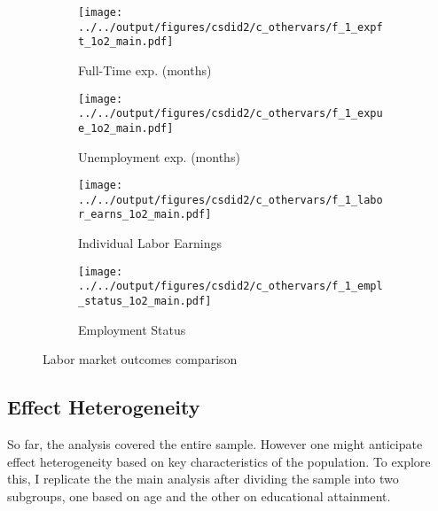 \begin{figure}[tb!]
    \centering
    \begin{subfigure}{0.45\textwidth}
        \caption{Full-Time exp. (months)}
        \texttt{[image: ../../output/figures/csdid2/c\_othervars/f\_1\_expft\_1o2\_main.pdf]}
        \label{sfig:c_expft_main}
    \end{subfigure}
    \begin{subfigure}{0.45\textwidth}
        \caption{Unemployment exp. (months)}
        \texttt{[image: ../../output/figures/csdid2/c\_othervars/f\_1\_expue\_1o2\_main.pdf]}
        \label{sfig:c_expue_main}
    \end{subfigure}
    \begin{subfigure}{0.45\textwidth}
        \caption{Individual Labor Earnings}
        \texttt{[image: ../../output/figures/csdid2/c\_othervars/f\_1\_labor\_earns\_1o2\_main.pdf]}
        \label{sfig:c_labor_earns_main}
    \end{subfigure}
    \begin{subfigure}{0.45\textwidth}
        \caption{Employment Status}
        \texttt{[image: ../../output/figures/csdid2/c\_othervars/f\_1\_empl\_status\_1o2\_main.pdf]}
        \label{sfig:c_empl_status_main}
    \end{subfigure}
    \caption{Labor market outcomes comparison} 
    \label{fig:csdid_labor}
\end{figure}


\subsection{Effect Heterogeneity}\label{sec:effheterog}

\newcommand{\commonnotesheterogb}{%
    Whiskers depict the 95\% confidence interval. 
    Reduced event window due to decrease in precision after dividing the sample into subgrous.
    }


So far, the analysis covered the entire sample. However one might anticipate effect heterogeneity based on key
characteristics of the population. To explore this, I replicate the the main analysis after dividing the sample
into two subgroups, one based on age and the other on educational attainment.

